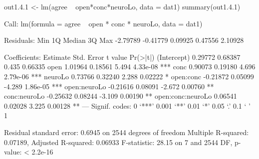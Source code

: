 \begin{Schunk}
\begin{Sinput}
 out1.4.1 <- lm(agree ~ open*conc*neuroLo, data = dat1)
 summary(out1.4.1)
\end{Sinput}
\begin{Soutput}
Call:
lm(formula = agree ~ open * conc * neuroLo, data = dat1)

Residuals:
     Min       1Q   Median       3Q      Max 
-2.79789 -0.41779  0.09925  0.47556  2.10928 

Coefficients:
                  Estimate Std. Error t value Pr(>|t|)    
(Intercept)        0.29772    0.68387   0.435  0.66335    
open               1.01964    0.18561   5.494 4.33e-08 ***
conc               0.90073    0.19180   4.696 2.79e-06 ***
neuroLo            0.73766    0.32240   2.288  0.02222 *  
open:conc         -0.21872    0.05099  -4.289 1.86e-05 ***
open:neuroLo      -0.21616    0.08091  -2.672  0.00760 ** 
conc:neuroLo      -0.25632    0.08244  -3.109  0.00190 ** 
open:conc:neuroLo  0.06541    0.02028   3.225  0.00128 ** 
---
Signif. codes:  0 ‘***’ 0.001 ‘**’ 0.01 ‘*’ 0.05 ‘.’ 0.1 ‘ ’ 1

Residual standard error: 0.6945 on 2544 degrees of freedom
Multiple R-squared:  0.07189,	Adjusted R-squared:  0.06933 
F-statistic: 28.15 on 7 and 2544 DF,  p-value: < 2.2e-16
\end{Soutput}
\end{Schunk}
